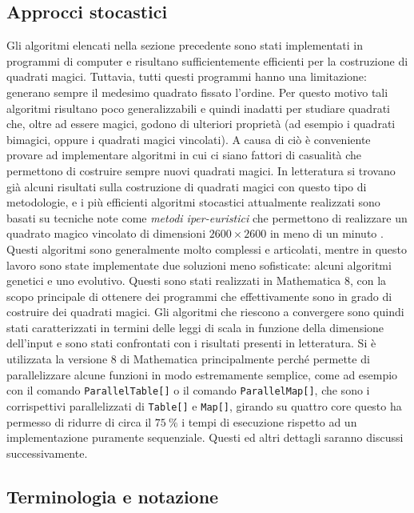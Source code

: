 \documentclass[italian,twoside,twocolumn]{article}
\begin{document}
\subsection{Approcci stocastici}
Gli algoritmi elencati nella sezione precedente sono stati implementati in programmi di computer e risultano sufficientemente efficienti per la costruzione di quadrati magici. Tuttavia, tutti questi programmi hanno una limitazione: generano sempre il medesimo quadrato fissato l'ordine. Per questo motivo tali algoritmi risultano poco generalizzabili e quindi inadatti per studiare quadrati che, oltre ad essere magici, godono di ulteriori proprietà (ad esempio i quadrati bimagici, oppure i quadrati magici vincolati). A causa di ciò è conveniente provare ad implementare algoritmi in cui ci siano fattori di casualità che permettono di costruire sempre nuovi quadrati magici. In letteratura si trovano già alcuni risultati sulla costruzione di quadrati magici con questo tipo di metodologie, e i più efficienti algoritmi stocastici attualmente realizzati sono basati su tecniche note come \emph{metodi iper-euristici} che permettono di realizzare un quadrato magico vincolato di dimensioni $ 2600\times 2600 $ in meno di un minuto \cite{AhmedEnder:2014}. Questi algoritmi sono generalmente molto complessi e articolati, mentre in questo lavoro sono state implementate due soluzioni meno sofisticate: alcuni algoritmi genetici e uno evolutivo. Questi sono stati realizzati in Mathematica 8, con la scopo principale di ottenere dei programmi che effettivamente sono in grado di costruire dei quadrati magici. Gli algoritmi che riescono a convergere sono quindi stati caratterizzati in termini delle leggi di scala in funzione della dimensione dell'input e sono stati confrontati con i risultati presenti in letteratura. Si è utilizzata la versione 8 di Mathematica principalmente perché permette di parallelizzare alcune funzioni in modo estremamente semplice, come ad esempio con il comando \texttt{ParallelTable[]} o il comando \texttt{ParallelMap[]}, che sono i corrispettivi parallelizzati di \texttt{Table[]} e \texttt{Map[]}, girando su quattro core questo ha permesso di ridurre di circa il $ \SI{75}{\percent} $ i tempi di esecuzione rispetto ad un implementazione puramente sequenziale. Questi ed altri dettagli saranno discussi successivamente.

\subsection{Terminologia e notazione}
\end{document}

